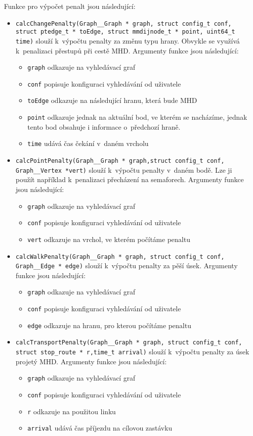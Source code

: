 Funkce pro výpočet penalt jsou následující:
\begin{itemize}
	\item {\tt calcChangePenalty(Graph\_\_Graph * graph, struct config\_t conf,
	struct ptedge\_t * toEdge, struct mmdijnode\_t * point, uint64\_t time)}
	slouží k~výpočtu penalty za změnu typu hrany. Obvykle se využívá
k~penalizaci přestupů při cestě MHD.
	Argumenty funkce jsou následující:
	\begin{itemize}
		\item {\tt graph} odkazuje na vyhledávací graf
		\item {\tt conf} popisuje konfiguraci vyhledávání od uživatele
		\item {\tt toEdge} odkazuje na následující hranu, která bude MHD   
		\item {\tt point} odkazuje jednak na aktuální bod, ve kterém se
		nacházíme, jednak tento bod obsahuje i informace o~předchozí
		hraně.
		\item {\tt time} udává čas čekání v~daném vrcholu
	\end{itemize}
	\item {\tt calcPointPenalty(Graph\_\_Graph * graph,struct config\_t conf,
	Graph\_\_Vertex *vert)} slouží k~výpočtu penalty v~daném bodě. Lze ji
	použít například k~penalizaci přecházení na semaforech. Argumenty
	funkce jsou následující:
	\begin{itemize}
		\item {\tt graph} odkazuje na vyhledávací graf
		\item {\tt conf} popisuje konfiguraci vyhledávání od uživatele
		\item {\tt vert} odkazuje na vrchol, ve kterém počítáme penaltu
	\end{itemize}
	\item {\tt calcWalkPenalty(Graph\_\_Graph * graph, struct config\_t
	conf, Graph\_\_Edge * edge)} slouží k~výpočtu penalty za pěší úsek.
	Argumenty funkce jsou následující:
	\begin{itemize}
		\item {\tt graph} odkazuje na vyhledávací graf
		\item {\tt conf} popisuje konfiguraci vyhledávání od uživatele
		\item {\tt edge} odkazuje na hranu, pro kterou počítáme penaltu
	\end{itemize}
	\item {\tt calcTransportPenalty(Graph\_\_Graph * graph, struct config\_t
	conf, struct stop\_route * r,time\_t arrival)} slouží k~výpočtu penalty
	za úsek projetý MHD. Argumenty funkce jsou následující:
	\begin{itemize}
		\item {\tt graph} odkazuje na vyhledávací graf
		\item {\tt conf} popisuje konfiguraci vyhledávání od uživatele
		\item {\tt r} odkazuje na použitou linku
		\item {\tt arrival} udává čas příjezdu na cílovou zastávku
	\end{itemize}
\end{itemize}

